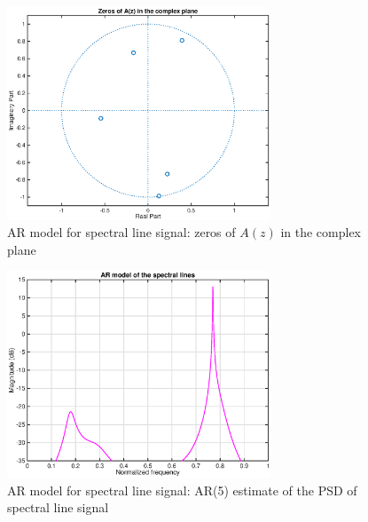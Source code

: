 \documentclass[10pt]{article}
\numberwithin{equation}{section}
\begin{document}
\begin{figure}[h!]
  \centering
  \includegraphics[width = 0.7\textwidth]{images/ar_lines_zeros}
  \caption{AR model for spectral line signal: zeros of $A(z)$ in the complex plane}
  \label{fig:zpl_lines}
\end{figure}


\begin{figure}[htp]
  \centering
  \includegraphics[width = 0.7\textwidth]{images/ar_lines_psd}
  \caption{AR model for spectral line signal: AR(5) estimate of the PSD of spectral line signal}
  \label{fig:psd_lines}
\end{figure}
\end{document}
